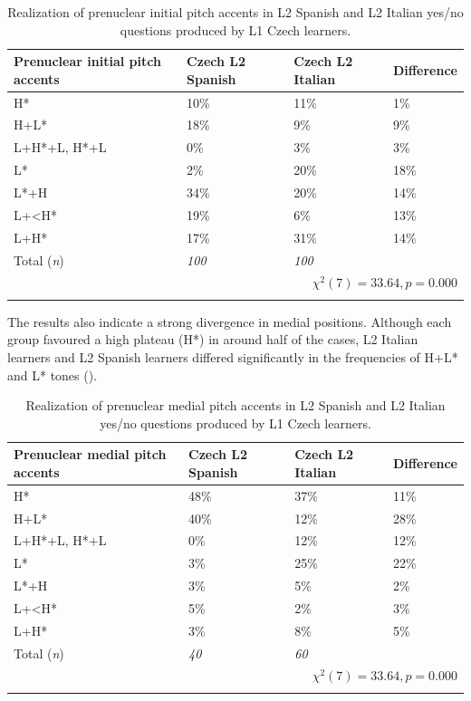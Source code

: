 \begin{table}[p]
\begin{tabularx}{\textwidth}{lYYY}

\lsptoprule

{Prenuclear initial pitch accents} & {Czech L2 Spanish} & {Czech L2 Italian} & {Difference}\\
\midrule
H* &  10\% &  11\% &  1\%\\
H+L* &  18\% &  9\% &  9\%\\
L+H*+L, H*+L &  0\% & 3\% &  3\%\\
L* &  2\% &  20\% &  18\%\\
L*+H &  34\% &  20\% &  14\%\\
L+<H* &  19\% &  6\% &  13\%\\
L+H* &  17\% &  31\% &  14\%\\
\midrule
Total (\textit{n}) & {\itshape 100} & {\itshape 100} &  \\
\\
\lspbottomrule
\end{tabularx}

\caption{Realization of prenuclear initial pitch accents in L2 Spanish and L2 Italian yes/no questions produced by L1 Czech learners.}
\label{tab:4.24}
\end{table}

The results also indicate a strong divergence in medial positions. Although each group favoured a high plateau (H*) in around half of the cases, L2 Italian learners and L2 Spanish learners differed significantly in the frequencies of H+L* and L* tones ().

\begin{table}[p]
\begin{tabularx}{\textwidth}{lYYY}

\lsptoprule

{Prenuclear medial pitch accents} & {Czech L2 Spanish} & {Czech L2 Italian} & {Difference}\\
\midrule
H* &  48\% &  37\% &  11\%\\
H+L* &  40\% &  12\% &  28\%\\
L+H*+L, H*+L &  0\% & 12\% &  12\%\\
L* &  3\% &  25\% &  22\%\\
L*+H &  3\% &  5\% &  2\%\\
L+<H* &  5\% &  2\% &  3\%\\
L+H* &  3\% &  8\% &  5\%\\
\midrule
Total (\textit{n}) & {\itshape 40} & {\itshape 60} &  \\
\\
\lspbottomrule
\end{tabularx}

\caption{Realization of prenuclear medial pitch accents in L2 Spanish and L2 Italian yes/no questions produced by L1 Czech learners.}
\label{tab:4.25}
\end{table}

